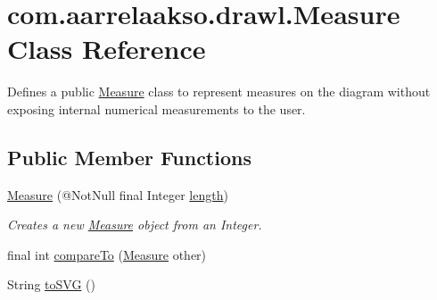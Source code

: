 \hypertarget{classcom_1_1aarrelaakso_1_1drawl_1_1_measure}{}\section{com.\+aarrelaakso.\+drawl.\+Measure Class Reference}
\label{classcom_1_1aarrelaakso_1_1drawl_1_1_measure}


Defines a public \hyperlink{classcom_1_1aarrelaakso_1_1drawl_1_1_measure}{Measure} class to represent measures on the diagram without exposing internal numerical measurements to the user.  


\subsection*{Public Member Functions}
\begin{DoxyCompactItemize}
\item 
\hyperlink{classcom_1_1aarrelaakso_1_1drawl_1_1_measure_a1960447b4b9dc0f4e71a2b86af31c52c}{Measure} (@Not\+Null final Integer \hyperlink{classcom_1_1aarrelaakso_1_1drawl_1_1_measure_aef040b9b0dd7d4a925448d0854c2444a}{length})
\begin{DoxyCompactList}\small\item\em Creates a new \hyperlink{classcom_1_1aarrelaakso_1_1drawl_1_1_measure}{Measure} object from an Integer. \end{DoxyCompactList}\item 
final int \hyperlink{classcom_1_1aarrelaakso_1_1drawl_1_1_measure_a02dc28edb78877bfc79eabe63ddde6f3}{compare\+To} (\hyperlink{classcom_1_1aarrelaakso_1_1drawl_1_1_measure}{Measure} other)
\item 
String \hyperlink{classcom_1_1aarrelaakso_1_1drawl_1_1_measure_a7b6b8ce14224c2b74aee35ef4516ee88}{to\+S\+VG} ()
\end{DoxyCompactItemize}
